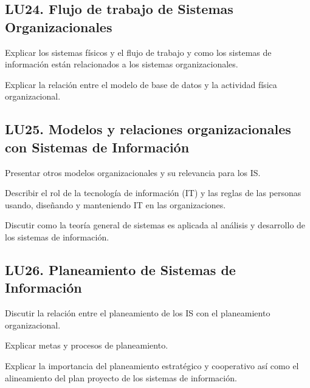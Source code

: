 \subsection{LU24. Flujo de trabajo de Sistemas Organizacionales}\label{sec:LU24}
\begin{LearningUnit}
\begin{LUGoal}
\item Explicar los sistemas físicos y el flujo de trabajo y como los sistemas de información están relacionados a los sistemas organizacionales.
\end{LUGoal}

\begin{LUObjective}
\item Explicar la relación entre el modelo de base de datos   y la actividad física organizacional.
\end{LUObjective}
\end{LearningUnit}

\subsection{LU25. Modelos y relaciones organizacionales con Sistemas de Información}\label{sec:LU25}
\begin{LearningUnit}
\begin{LUGoal}
\item Presentar otros modelos organizacionales  y su relevancia para los IS.
\end{LUGoal}

\begin{LUObjective}
\item Describir el rol de la tecnología de información (IT) y las reglas de las personas usando, diseñando y manteniendo IT en las organizaciones.
\item Discutir como la teoría general de sistemas es aplicada al análisis y desarrollo de los sistemas de información.
\end{LUObjective}
\end{LearningUnit}

\subsection{LU26. Planeamiento de Sistemas de Información}\label{sec:LU26}
\begin{LearningUnit}
\begin{LUGoal}
\item Discutir la relación  entre el planeamiento de los IS  con el planeamiento organizacional.
\end{LUGoal}

\begin{LUObjective}
\item Explicar metas y procesos de planeamiento.
\item Explicar la importancia del planeamiento estratégico  y cooperativo  así como el alineamiento del plan proyecto de los sistemas de información.
\end{LUObjective}
\end{LearningUnit}

